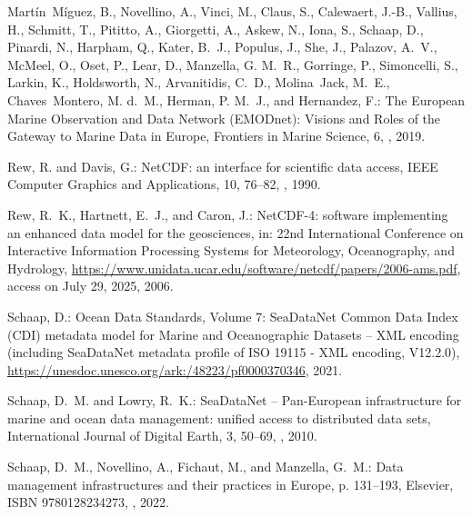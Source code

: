 \documentclass[essd, manuscript]{copernicus}
\begin{document}
\begin{thebibliography}{52}
Martín~Míguez, B., Novellino, A., Vinci, M., Claus, S., Calewaert, J.-B.,
  Vallius, H., Schmitt, T., Pititto, A., Giorgetti, A., Askew, N., Iona, S.,
  Schaap, D., Pinardi, N., Harpham, Q., Kater, B.~J., Populus, J., She, J.,
  Palazov, A.~V., McMeel, O., Oset, P., Lear, D., Manzella, G. M.~R., Gorringe,
  P., Simoncelli, S., Larkin, K., Holdsworth, N., Arvanitidis, C.~D.,
  Molina~Jack, M.~E., Chaves~Montero, M. d.~M., Herman, P. M.~J., and
  Hernandez, F.: The European Marine Observation and Data Network (EMODnet):
  Visions and Roles of the Gateway to Marine Data in Europe, Frontiers in
  Marine Science, 6, , 2019.

Rew, R. and Davis, G.: NetCDF: an interface for scientific data access, IEEE
  Computer Graphics and Applications, 10, 76--82, , 1990.

Rew, R.~K., Hartnett, E.~J., and Caron, J.: {NetCDF-4: software implementing an
  enhanced data model for the geosciences}, in: {22nd International Conference
  on Interactive Information Processing Systems for Meteorology, Oceanography,
  and Hydrology},
  \urlprefix\url{https://www.unidata.ucar.edu/software/netcdf/papers/2006-ams.pdf},
  access on July 29, 2025, 2006.

Schaap, D.: {Ocean Data Standards, Volume 7: SeaDataNet Common Data Index (CDI)
  metadata model for Marine and Oceanographic Datasets – XML encoding
  (including SeaDataNet metadata profile of ISO 19115 - XML encoding,
  V12.2.0)},
  \urlprefix\url{https://unesdoc.unesco.org/ark:/48223/pf0000370346}, 2021.

Schaap, D.~M. and Lowry, R.~K.: {SeaDataNet – Pan-European infrastructure for
  marine and ocean data management: unified access to distributed data sets},
  International Journal of Digital Earth, 3, 50–69,
  , 2010.

Schaap, D.~M., Novellino, A., Fichaut, M., and Manzella, G.~M.: Data management
  infrastructures and their practices in Europe, p. 131–193, Elsevier, ISBN
  9780128234273, , 2022.


\end{thebibliography}
\end{document}
